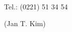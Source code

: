 \documentclass[a4paper]{article}
\begin{document}
\begin{description}
{  Tel.: (0221) 51 34 54 \\
% 
}

\end{description}

\vspace*{3cm}

\centerline{(Jan T. Kim)}
\end{document}

